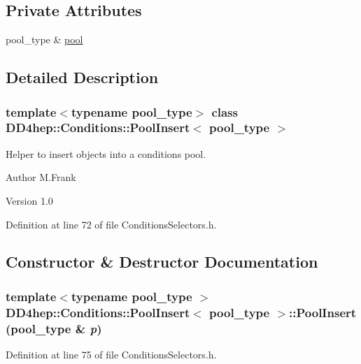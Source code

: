 \subsection*{Private Attributes}
\begin{DoxyCompactItemize}
\item 
pool\_\-type \& \hyperlink{class_d_d4hep_1_1_conditions_1_1_pool_insert_aba19eeaf8d2e0a226176234c454c6213}{pool}
\end{DoxyCompactItemize}


\subsection{Detailed Description}
\subsubsection*{template$<$typename pool\_\-type$>$ class DD4hep::Conditions::PoolInsert$<$ pool\_\-type $>$}

Helper to insert objects into a conditions pool. \begin{DoxyAuthor}{Author}
M.Frank 
\end{DoxyAuthor}
\begin{DoxyVersion}{Version}
1.0 
\end{DoxyVersion}


Definition at line 72 of file ConditionsSelectors.h.

\subsection{Constructor \& Destructor Documentation}
\hypertarget{class_d_d4hep_1_1_conditions_1_1_pool_insert_a577e9561b1733e791ad4218a289936c1}{
\subsubsection[{PoolInsert}]{\setlength{\rightskip}{0pt plus 5cm}template$<$typename pool\_\-type $>$ {\bf DD4hep::Conditions::PoolInsert}$<$ pool\_\-type $>$::{\bf PoolInsert} (pool\_\-type \& {\em p})}}
\label{class_d_d4hep_1_1_conditions_1_1_pool_insert_a577e9561b1733e791ad4218a289936c1}


Definition at line 75 of file ConditionsSelectors.h.

